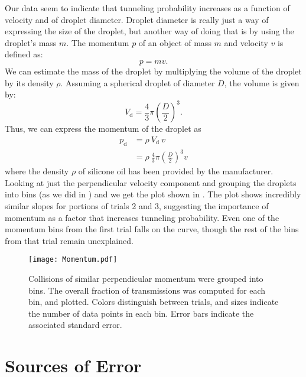 Our data seem to indicate that tunneling probability increases as a function of velocity and of droplet diameter. Droplet diameter is really just a way of expressing the size of the droplet, but another way of doing that is by using the droplet's mass $m$. The momentum $p$ of an object of mass $m$ and velocity $v$ is defined as:
$$p = mv.$$
We can estimate the mass of the droplet by multiplying the volume of the droplet by its density $\rho$. Assuming a spherical droplet of diameter $D$, the volume is given by:
$$V_\mathrm{d} = \frac{4}{3}\pi \left(\frac{D}{2}\right)^3.$$
Thus, we can express the momentum of the droplet as
\begin{align}
p_\mathrm{d} &= \rho~V_\mathrm{d}~v \\
& = \rho~\frac{4}{3}\pi \left(\frac{D}{2}\right)^3 v
\end{align}
where the density $\rho$ of silicone oil has been provided by the manufacturer. Looking at just the perpendicular velocity component and grouping the droplets into bins (as we did in ) and we get the plot shown in . The plot shows incredibly similar slopes for portions of trials 2 and 3, suggesting the importance of momentum as a factor that increases tunneling probability. Even one of the momentum bins from the first trial falls on the curve, though the rest of the bins from that trial remain unexplained. 

\begin{figure}[h!]
	\centering
	\texttt{[image: Momentum.pdf]}
	\caption{Collisions of similar perpendicular momentum were grouped into bins. The overall fraction of transmissions was computed for each bin, and plotted. Colors distinguish between trials, and sizes indicate the number of data points in each bin. Error bars indicate the associated standard error. }
	\label{fig:mom}
\end{figure}




\section{Sources of Error}
\label{sect:error}

